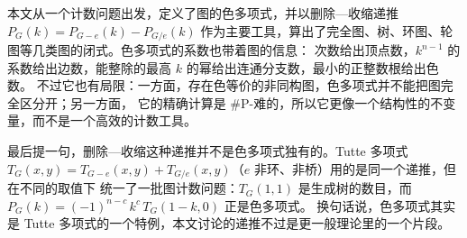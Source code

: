\documentclass[10pt]{article}
\newcommand{\chrom}[2]{P_{#1}(#2)}        %
\begin{document}
本文从一个计数问题出发，定义了图的色多项式，并以删除—收缩递推 $\chrom{G}{k}=\chrom{G-e}{k}-\chrom{G/e}{k}$
作为主要工具，算出了完全图、树、环图、轮图等几类图的闭式。色多项式的系数也带着图的信息：
次数给出顶点数，$k^{n-1}$ 的系数给出边数，能整除的最高 $k$ 的幂给出连通分支数，最小的正整数根给出色数。
不过它也有局限：一方面，存在色等价的非同构图，色多项式并不能把图完全区分开；另一方面，
它的精确计算是 \#P-难的，所以它更像一个结构性的不变量，而不是一个高效的计数工具。

最后提一句，删除—收缩这种递推并不是色多项式独有的。Tutte 多项式
$T_G(x,y)=T_{G-e}(x,y)+T_{G/e}(x,y)$（$e$ 非环、非桥）用的是同一个递推，但在不同的取值下
统一了一批图计数问题：$T_G(1,1)$ 是生成树的数目，而 $\chrom{G}{k}=(-1)^{n-c}\,k^{c}\,T_G(1-k,0)$ 正是色多项式。
换句话说，色多项式其实是 Tutte 多项式的一个特例，本文讨论的递推不过是更一般理论里的一个片段。
\end{document}
